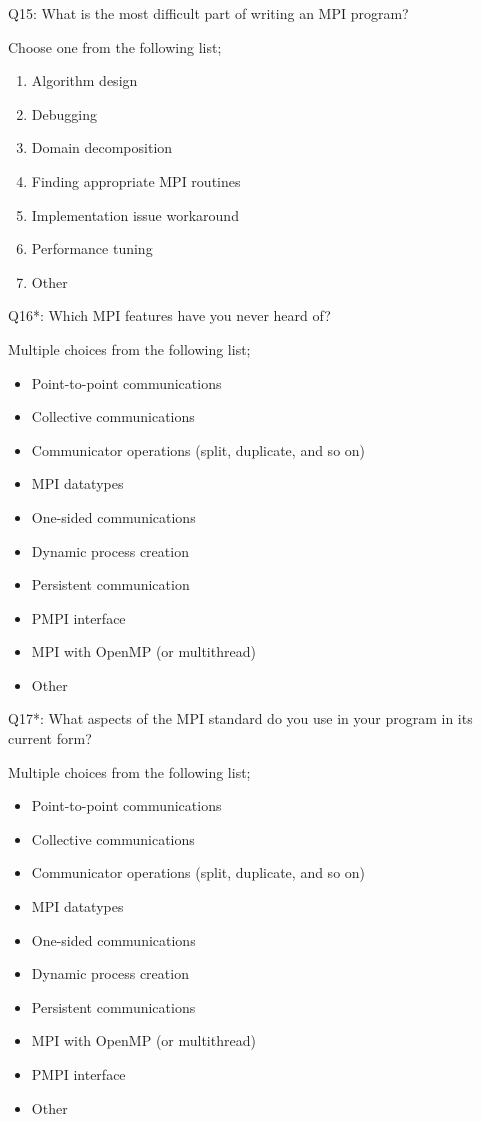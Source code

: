\begin{description}
\item{Q15:} What is the most difficult part of writing an MPI program?

Choose one from the following list;
\begin{enumerate}
\item Algorithm design
\item Debugging
\item Domain decomposition
\item Finding appropriate MPI routines
\item Implementation issue workaround
\item Performance tuning
\item Other
\end{enumerate}

\item{Q16*:} Which MPI features have you never heard of?

Multiple choices from the following list;
\begin{itemize}
\item Point-to-point communications
\item Collective communications
\item Communicator operations (split, duplicate, and so on)
\item MPI datatypes
\item One-sided communications
\item Dynamic process creation
\item Persistent communication
\item PMPI interface
\item MPI with OpenMP (or multithread)
\item Other
\end{itemize}

\item{Q17*:} What aspects of the MPI standard do you use in your program in its current form?

Multiple choices from the following list;
\begin{itemize}
\item Point-to-point communications
\item Collective communications
\item Communicator operations (split, duplicate, and so on)
\item MPI datatypes
\item One-sided communications
\item Dynamic process creation
\item Persistent communications
\item MPI with OpenMP (or multithread)
\item PMPI interface
\item Other
\end{itemize}


\end{description}
